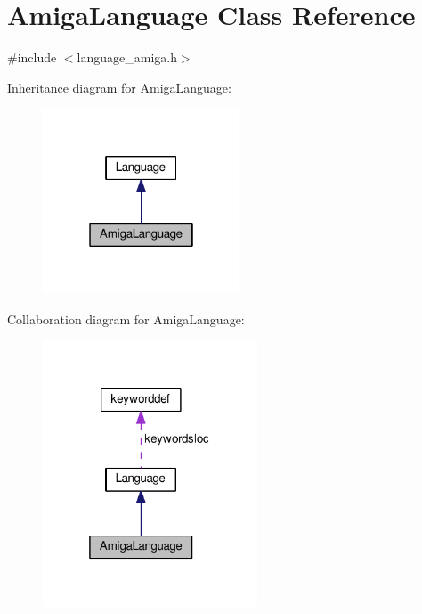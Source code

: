 \hypertarget{classAmigaLanguage}{}\section{Amiga\+Language Class Reference}
\label{classAmigaLanguage}


{\ttfamily \#include $<$language\+\_\+amiga.\+h$>$}



Inheritance diagram for Amiga\+Language\+:
\nopagebreak
\begin{figure}[H]
\begin{center}
\leavevmode
\includegraphics[width=166pt]{d4/d4f/classAmigaLanguage__inherit__graph}
\end{center}
\end{figure}


Collaboration diagram for Amiga\+Language\+:
\nopagebreak
\begin{figure}[H]
\begin{center}
\leavevmode
\includegraphics[width=181pt]{da/d4e/classAmigaLanguage__coll__graph}
\end{center}
\end{figure}
